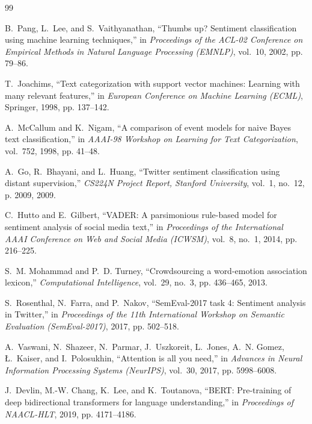 \begin{thebibliography}{99}

B.~Pang, L.~Lee, and S.~Vaithyanathan, ``Thumbs up? Sentiment classification using machine learning techniques,'' in \emph{Proceedings of the ACL-02 Conference on Empirical Methods in Natural Language Processing (EMNLP)}, vol.~10, 2002, pp. 79--86.

T.~Joachims, ``Text categorization with support vector machines: Learning with many relevant features,'' in \emph{European Conference on Machine Learning (ECML)}, Springer, 1998, pp. 137--142.

A.~McCallum and K.~Nigam, ``A comparison of event models for naive Bayes text classification,'' in \emph{AAAI-98 Workshop on Learning for Text Categorization}, vol.~752, 1998, pp. 41--48.

A.~Go, R.~Bhayani, and L.~Huang, ``Twitter sentiment classification using distant supervision,'' \emph{CS224N Project Report, Stanford University}, vol.~1, no.~12, p. 2009, 2009.

C.~Hutto and E.~Gilbert, ``VADER: A parsimonious rule-based model for sentiment analysis of social media text,'' in \emph{Proceedings of the International AAAI Conference on Web and Social Media (ICWSM)}, vol.~8, no.~1, 2014, pp. 216--225.

S.~M. Mohammad and P.~D. Turney, ``Crowdsourcing a word-emotion association lexicon,'' \emph{Computational Intelligence}, vol.~29, no.~3, pp. 436--465, 2013.

S.~Rosenthal, N.~Farra, and P.~Nakov, ``SemEval-2017 task 4: Sentiment analysis in Twitter,'' in \emph{Proceedings of the 11th International Workshop on Semantic Evaluation (SemEval-2017)}, 2017, pp. 502--518.

A.~Vaswani, N.~Shazeer, N.~Parmar, J.~Uszkoreit, L.~Jones, A.~N. Gomez, {\L}.~Kaiser, and I.~Polosukhin, ``Attention is all you need,'' in \emph{Advances in Neural Information Processing Systems (NeurIPS)}, vol.~30, 2017, pp. 5998--6008.

J.~Devlin, M.-W. Chang, K.~Lee, and K.~Toutanova, ``BERT: Pre-training of deep bidirectional transformers for language understanding,'' in \emph{Proceedings of NAACL-HLT}, 2019, pp. 4171--4186.


\end{thebibliography}
